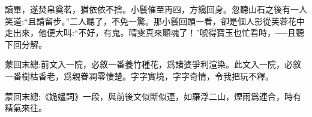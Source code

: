 \begin{parag}
    讀畢，遂焚帛奠茗，猶依依不捨。小鬟催至再四，方纔回身。忽聽山石之後有一人笑道:“且請留步。”二人聽了，不免一驚。那小鬟回頭一看，卻是個人影從芙蓉花中走出來，他便大叫:“不好，有鬼。晴雯真來顯魂了！”唬得寶玉也忙看時，──且聽下回分解。
\end{parag}


\begin{parag}
    \begin{note}蒙回末總:前文入一院，必敘一番養竹種花，爲諸婆爭利渲染。此文入一院，必敘一番樹枯香老，爲親眷凋零悽楚。字字實境，字字奇情，令我把玩不釋。\end{note}
\end{parag}


\begin{parag}
    \begin{note}蒙回末總:《姽嫿詞》一段，與前後文似斷似連，如羅浮二山，煙雨爲連合，時有精氣來往。\end{note}
\end{parag}
